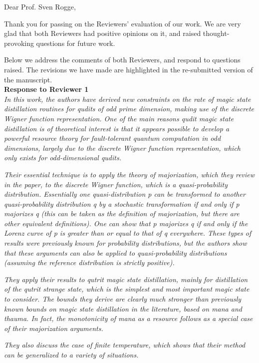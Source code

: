 \documentclass[11pt]{letter}
\begin{document}
Dear Prof. Sven Rogge,

Thank you for passing on the Reviewers' evaluation of our work. We are very glad that both Reviewers had positive opinions on it, and raised thought-provoking questions for future work.

Below we address the comments of both Reviewers, and respond to questions raised.  The revisions we have made are highlighted in the re-submitted version of the manuscript.\\

\textbf{\large{Response to Reviewer 1}}\\

\textit{In this work, the authors have derived new constraints on the rate of magic state distillation routines for qudits of odd prime dimension, making use of the discrete Wigner function representation. One of the main reasons qudit magic state distillation is of theoretical interest is that it appears possible to develop a powerful resource theory for fault-tolerant quantum computation in odd dimensions, largely due to the discrete Wigner function representation, which only exists for odd-dimensional qudits.}

\textit{Their essential technique is to apply the theory of majorization, which they review in the paper, to the discrete Wigner function, which is a quasi-probability distribution. Essentially one quasi-distribution p can be transformed to another quasi-probability distribution q by a stochastic transformation if and only if p majorizes q (this can be taken as the definition of majorization, but there are other equivalent definitions). One can show that p majorizes q if and only if the Lorenz curve of p is greater than or equal to that of q everywhere. These types of results were previously known for probability distributions, but the authors show that these arguments can also be applied to quasi-probability distributions (assuming the reference distribution is strictly positive).}

\textit{They apply their results to qutrit magic state distillation, mainly for distillation of the qutrit strange state, which is the simplest and most important magic state to consider. The bounds they derive are clearly much stronger than previously known bounds on magic state distillation in the literature, based on mana and thauma. In fact, the monotonicity of mana as a resource follows as a special case of their majorization arguments.}

\textit{They also discuss the case of finite temperature, which shows that their method can be generalized to a variety of situations.}
\end{document}

